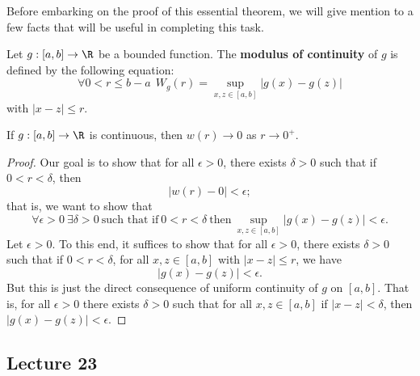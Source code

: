 Before embarking on the proof of this essential theorem, we will give mention to a few facts that will be useful in completing this task. 

\begin{definition}
    Let \( g: [a,b] \to \R  \) be a bounded function. The \textbf{modulus of continuity} of \( g  \) is defined by the following equation:
    \[  \forall 0 < r \leq b - a \ \ {W}_{g}(r) = \sup_{x,z \in [a,b]} | g(x) - g(z) |  \]
    with \( | x - z  |  \leq r  \).
\end{definition}


\begin{prop}[Fact 1]\label{Fact 1}
    If \( g:[a,b] \to \R  \) is continuous, then \( w(r) \to 0  \) as \( r \to 0^{+}  \). 
\end{prop}
\begin{proof}
Our goal is to show that for all \( \epsilon > 0  \), there exists \( \delta > 0  \) such that if \( 0 < r < \delta  \), then 
\[  | w(r) - 0  |  < \epsilon; \]
that is, we want to show that 
\[  \forall \epsilon > 0 \ \exists \delta > 0 \ \text{such that if} \ 0 < r < \delta \ \text{then} \ \sup_{x,z \in [a,b]} | g(x) - g(z) |  < \epsilon. \]
Let \( \epsilon > 0 \). To this end, it suffices to show that for all \( \epsilon > 0  \), there exists \( \delta > 0  \) such that if \( 0 < r < \delta  \), for all \( x,z \in [a,b] \) with \( | x - z  |  \leq r  \), we have  
\[  |g(x) - g(z)|  < \epsilon. \]
But this is just the direct consequence of uniform continuity of \( g  \) on \( [a,b] \). That is, for all \( \epsilon > 0  \) there exists \( \delta > 0  \) such that for all \( x,z \in [a,b] \) if \( |  x - z  |  < \delta  \), then \( | g(x) - g(z) |  < \epsilon \). 
\end{proof}


\subsection{Lecture 23}

